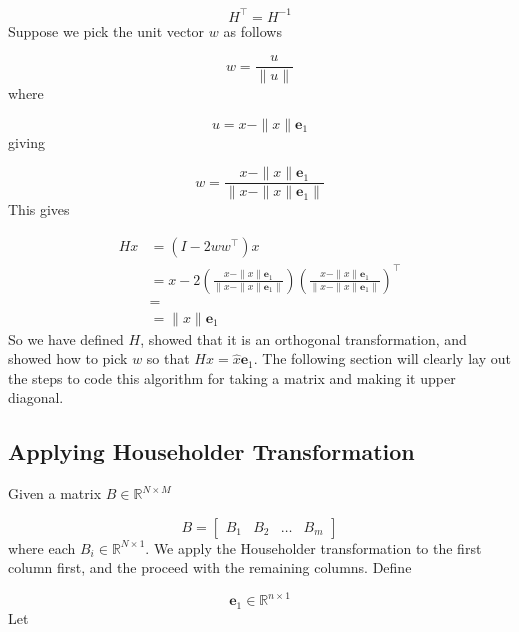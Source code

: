 \begin{equation*}
  H^{\top}=H^{-1}
\end{equation*}
Suppose we pick the unit vector $w$ as follows

\begin{equation*}
  w=\frac{u}{\|u\|}
\end{equation*}
where

\begin{equation*}
  u=x-\|x\|\mathbf{e}_{1}
\end{equation*}
giving

\begin{equation*}
  w=\frac{x-\|x\|\mathbf{e}_{1}}{\|x-\|x\|\mathbf{e}_{1}\|}
\end{equation*}
This gives

\begin{equation*}
  \begin{split}
    Hx&=(I-2ww^{\top})x \\
    &=x-2\left(\frac{x-\|x\|\mathbf{e}_{1}}{\|x-\|x\|\mathbf{e}_{1}\|}\right)\left(\frac{x-\|x\|\mathbf{e}_{1}}{\|x-\|x\|\mathbf{e}_{1}\|}\right)^{\top} \\
    &= \\
    &=\|x\|\mathbf{e}_{1}
  \end{split}
\end{equation*}
So we have defined $H$, showed that it is an orthogonal transformation, and showed how to pick $w$ so that $Hx=\hat{x}\mathbf{e}_{1}$.
The following section will clearly lay out the steps to code this algorithm for taking a matrix and making it upper diagonal.

\subsection{Applying Householder Transformation}

Given a matrix $B\in\mathbb{R}^{N\times M}$

\begin{equation*}
  B=
  \begin{bmatrix}
    B_{1} & B_{2} & \hdots & B_{m}
  \end{bmatrix}
\end{equation*}
where each $B_{i}\in\mathbb{R}^{N\times1}$.
We apply the Householder transformation to the first column first, and the proceed with the remaining columns.
Define

\begin{equation*}
  \mathbf{e}_{1}\in\mathbb{R}^{n\times1}
\end{equation*}
Let

